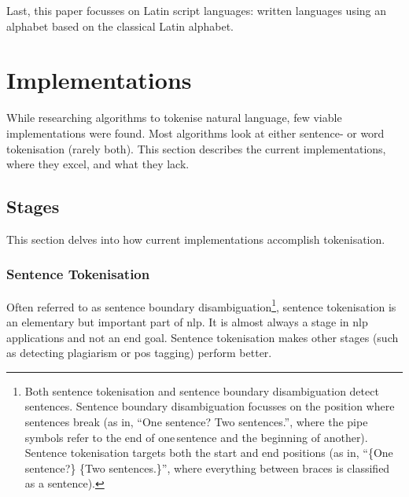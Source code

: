 Last, this paper focusses on Latin script languages: written languages
  using an alphabet based on the classical Latin alphabet.

\section{Implementations}\label{implementations}

While researching algorithms to tokenise natural language, few viable
  implementations were found.
Most algorithms look at either sentence- or word tokenisation (rarely both).
This section describes the current implementations, where they excel, and
  what they lack.

\subsection{Stages}\label{stages}

This section delves into how current implementations accomplish tokenisation.

\subsubsection{Sentence Tokenisation}\label{sentence-tokenisation}

Often referred to as sentence boundary disambiguation\footnote{Both
    sentence tokenisation and sentence boundary disambiguation detect
      sentences.
    Sentence boundary disambiguation focusses on the position where
      sentences break (as in, ``One sentence?\textbar{} Two
      sentences.\textbar{}'', where the pipe symbols refer to the end of
      one\,sentence and the beginning of another).
    Sentence tokenisation targets both the start and end positions (as in,
      ``\{One sentence?\} \{Two sentences.\}'', where everything between
      braces is classified as a sentence).}, sentence
  tokenisation is an elementary but important part of \gls{nlp}.
It is almost always a stage in \gls{nlp} applications and not an end goal.
Sentence tokenisation makes other stages (such\,as detecting plagiarism or
  \gls{pos} tagging) perform better.

